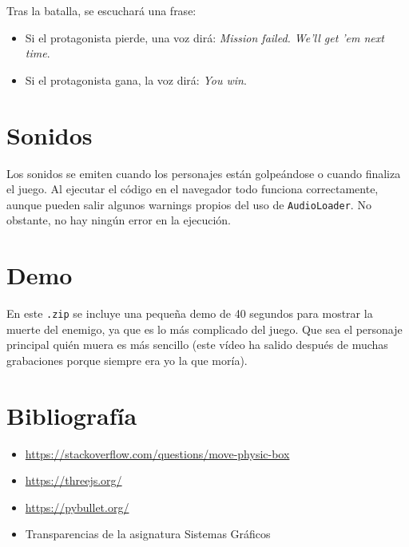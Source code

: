 \documentclass[11pt,a4paper]{article}
\begin{document}
Tras la batalla, se escuchará una frase:

\begin{itemize}
	\item Si el protagonista pierde, una voz dirá: \textit{Mission failed. We'll get 'em next time}.
	\item Si el protagonista gana, la voz dirá: \textit{You win}.
\end{itemize}


\section{Sonidos}

Los sonidos se emiten cuando los personajes están golpeándose o cuando finaliza el juego. Al ejecutar el código en el navegador todo funciona correctamente, aunque pueden salir algunos warnings propios del uso de \texttt{AudioLoader}. No obstante, no hay ningún error en la ejecución.

\section{Demo}

En este \texttt{.zip} se incluye una pequeña demo de 40 segundos para mostrar la muerte del enemigo, ya que es lo más complicado del juego. Que sea el personaje principal quién muera es más sencillo (este vídeo ha salido después de muchas grabaciones porque siempre era yo la que moría).

\section{Bibliografía}

\begin{itemize}
	\item \color{blue}\href{https://stackoverflow.com/questions/34569703/raycaster-does-not-move-boxmesh-objects}{https://stackoverflow.com/questions/move-physic-box}\color{black}
	\item \color{blue}\href{https://threejs.org/}{https://threejs.org/}\color{black}
	\item \color{blue}\href{https://pybullet.org/Bullet/phpBB3/index.php?sid=0e8c6e5111583be0d17f1731e4c1dc19}{https://pybullet.org/}\color{black}
	\item Transparencias de la asignatura Sistemas Gráficos
\end{itemize}
\end{document}
